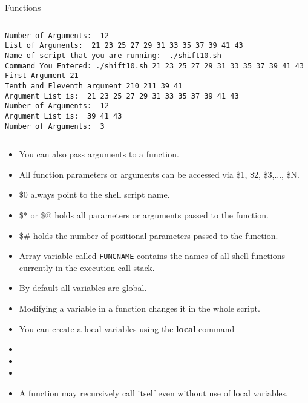 \documentclass[10pt,t]{beamer}
\begin{document}
\begin{frame}{Functions}
\begin{columns}
\begin{lstlisting}[style=LINUX,basicstyle=\fontsize{4}{4.5}\selectfont\ttfamily]
Number of Arguments:  12
List of Arguments:  21 23 25 27 29 31 33 35 37 39 41 43
Name of script that you are running:  ./shift10.sh
Command You Entered: ./shift10.sh 21 23 25 27 29 31 33 35 37 39 41 43
First Argument 21
Tenth and Eleventh argument 210 211 39 41
Argument List is:  21 23 25 27 29 31 33 35 37 39 41 43
Number of Arguments:  12
Argument List is:  39 41 43
Number of Arguments:  3
        \end{lstlisting}
    \end{columns}
  \framebreak
  \begin{itemize}
    \item You can also pass arguments to a function.
    \item All function parameters or arguments can be accessed via \$1, \$2, \$3,..., \$N.
    \item \$0 always point to the shell script name.
    \item \$* or \$@ holds all parameters or arguments passed to the function.
    \item \$\# holds the number of positional parameters passed to the function.
    \item Array variable called \texttt{FUNCNAME} contains the names of all shell functions currently in the execution call stack.
    \item By default all variables are global.
    \item Modifying a variable in a function changes it in the whole script.
    \item You can create a local variables using the \textbf{local} command
    \item[] 
    \item[] 
    \item[] 
  \end{itemize}
  \framebreak
  \begin{itemize}
    \item A function may recursively call itself even without use of local variables.
  \end{itemize}
  \fontsize{7}{9}
\end{frame}
\end{document}
